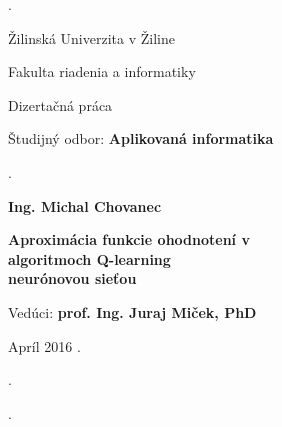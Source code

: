 \begin{titlepage}
\phantom.

\bigskip

\begin{center}
{\sc\LARGE Žilinská Univerzita v Žiline}
\medskip

{\sc\Large Fakulta riadenia a informatiky}

\vfill\vfill\vfill\vfill

{\sc\LARGE Dizertačná práca}

\medskip

{\large Študijný odbor: {\bf Aplikovaná informatika}}
\end{center}


\vfill\vfill\vfill\vfill


\phantom.\hfill
\begin{minipage}{10cm}
\begin{center}
{\large\bf Ing. Michal Chovanec}

\medskip

{\large\bf
  Aproximácia funkcie ohodnotení v \\
  algoritmoch Q-learning \\
  neurónovou sieťou
}

\medskip

Vedúci: {\bf prof. Ing. Juraj Miček, PhD}

\medskip

\hfill
Apríl 2016
\hfill\phantom.
\end{center}
\end{minipage}
\hspace{1.7cm}\phantom.

\vspace{2.9cm}

\phantom.
\end{titlepage}



\begin{abstract}

\noindent
{\sc Michal Chovanec:} {\em   Aproximácia funkcie ohodnotení v algoritmoch Q-learning neurónovou sieťou}
[Dizertačná práca]

\noindent
Žilinská Univerzita v~Žiline,
Fakulta riadenia a informatiky,
Katedra technickej kybernetiky.

\noindent
Vedúci: prof. Ing. Juraj Miček, PhD

\noindent
FRI ŽU v~Žiline, 2016

\bigskip

Práca sa zaoberá aproximáciou funkcie ohodnotení konania agenta, v algoritmoch Q-learning.
V priestoroch s malým počtom stavov predstavuje vhodné riešenie tabuľka.
Pre prípady veľkého počtu stavov je tabuľkové riešenie ťažko vypočítateľné. Je tak nutné použiť
aproximáciu. Vhodným kandidátom je neurónová sieť. Tradičné riešenie doprednej
siete je však nepoužiteľné z dôvodov nemožnosti takúto sieť učiť. V práci
je preto venovaný priestor neurónovej sieti bázických funkcií ktorú už je možné
na daný problém trénovať iteračnými metódami.

\end{abstract}


